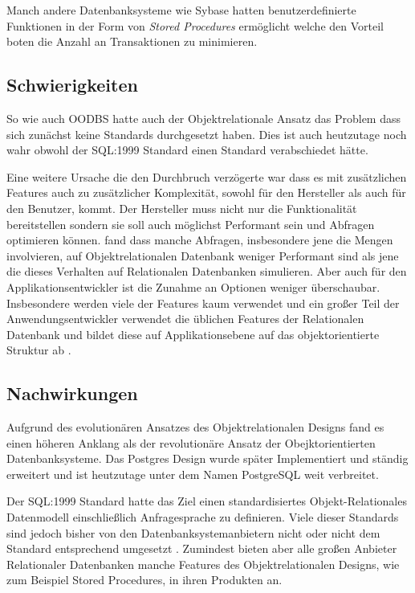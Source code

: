 Manch andere Datenbanksysteme wie Sybase hatten benutzerdefinierte Funktionen in der Form von \emph{Stored Procedures} ermöglicht welche den Vorteil boten die Anzahl an Transaktionen zu minimieren.

\subsection{Schwierigkeiten}
So wie auch OODBS hatte auch der Objektrelationale Ansatz das Problem dass sich zunächst keine Standards durchgesetzt haben. Dies ist auch heutzutage noch wahr obwohl der SQL:1999 Standard einen Standard verabschiedet hätte.

Eine weitere Ursache die den Durchbruch verzögerte war dass es mit zusätzlichen Features auch zu zusätzlicher Komplexität, sowohl für den Hersteller als auch für den Benutzer, kommt. Der Hersteller muss nicht nur die Funktionalität bereitstellen sondern sie soll auch möglichst Performant sein und Abfragen optimieren können. \cite{carey1997} fand dass manche Abfragen, insbesondere jene die Mengen involvieren, auf Objektrelationalen Datenbank weniger Performant sind als jene die dieses Verhalten auf Relationalen Datenbanken simulieren.
Aber auch für den Applikationsentwickler ist die Zunahme an Optionen weniger überschaubar. Insbesondere werden viele der Features kaum verwendet und ein großer Teil der Anwendungsentwickler verwendet die üblichen Features der Relationalen Datenbank und bildet diese auf Applikationsebene auf das objektorientierte Struktur ab \cite{fotache2009}.


\subsection{Nachwirkungen}
Aufgrund des evolutionären Ansatzes des Objektrelationalen Designs fand es einen höheren Anklang als der revolutionäre Ansatz der Obejktorientierten Datenbanksysteme. Das Postgres Design wurde später Implementiert und ständig erweitert und ist heutzutage unter dem Namen PostgreSQL weit verbreitet. 

Der SQL:1999 Standard hatte das Ziel einen standardisiertes Objekt-Relationales Datenmodell einschließlich Anfragesprache zu definieren. Viele dieser Standards sind jedoch bisher von den Datenbanksystemanbietern nicht oder nicht dem Standard entsprechend umgesetzt \cite{kemper2013}. Zumindest bieten aber alle großen Anbieter Relationaler Datenbanken manche Features des Objektrelationalen Designs, wie zum Beispiel Stored Procedures, in ihren Produkten an.


%